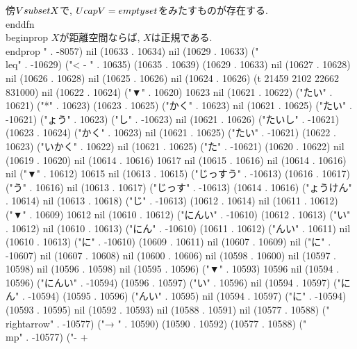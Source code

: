  傍$V\\subset X$で, $U\\cap V=\\emptyset$をみたすものが存在する.
\\end{dfn}
\\begin{prop}
 $X$が距離空間ならば, $X$は正規である.
\\end{prop}
" . -8057) nil (10633 . 10634) nil (10629 . 10633) ("\\leq" . -10629) ("<
-
" . 10635) (10635 . 10639) (10629 . 10633) nil (10627 . 10628) nil (10626 . 10628) nil (10625 . 10626) nil (10624 . 10626) (t 21459 2102 22662 831000) nil (10622 . 10624) ("▼" . 10620) 10623 nil (10621 . 10622) ("たい" . 10621) ("*" . 10623) (10623 . 10625) ("かく" . 10623) nil (10621 . 10625) ("たい" . -10621) ("ょう" . 10623) ("し" . -10623) nil (10621 . 10626) ("たいし" . -10621) (10623 . 10624) ("かく" . 10623) nil (10621 . 10625) ("たい" . -10621) (10622 . 10623) ("いかく" . 10622) nil (10621 . 10625) ("た" . -10621) (10620 . 10622) nil (10619 . 10620) nil (10614 . 10616) 10617 nil (10615 . 10616) nil (10614 . 10616) nil ("▼" . 10612) 10615 nil (10613 . 10615) ("じっすう" . -10613) (10616 . 10617) ("う" . 10616) nil (10613 . 10617) ("じっす" . -10613) (10614 . 10616) ("ょうけん" . 10614) nil (10613 . 10618) ("じ" . -10613) (10612 . 10614) nil (10611 . 10612) ("▼" . 10609) 10612 nil (10610 . 10612) ("にんい" . -10610) (10612 . 10613) ("い" . 10612) nil (10610 . 10613) ("にん" . -10610) (10611 . 10612) ("んい" . 10611) nil (10610 . 10613) ("に" . -10610) (10609 . 10611) nil (10607 . 10609) nil ("に" . -10607) nil (10607 . 10608) nil (10600 . 10606) nil (10598 . 10600) nil (10597 . 10598) nil (10596 . 10598) nil (10595 . 10596) ("▼" . 10593) 10596 nil (10594 . 10596) ("にんい" . -10594) (10596 . 10597) ("い" . 10596) nil (10594 . 10597) ("にん" . -10594) (10595 . 10596) ("んい" . 10595) nil (10594 . 10597) ("に" . -10594) (10593 . 10595) nil (10592 . 10593) nil (10588 . 10591) nil (10577 . 10588) ("\\rightarrow" . -10577) ("→
" . 10590) (10590 . 10592) (10577 . 10588) ("\\mp" . -10577) ("-
+
